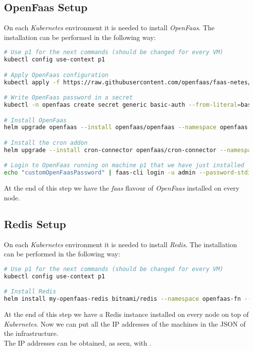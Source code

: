 \subsection{OpenFaas Setup}
On each \textit{Kubernetes} environment it is needed to install \textit{OpenFaas}. The installation can be performed in the following way:
\begin{lstlisting}[language=bash]
# Use p1 for the next commands (should be changed for every VM)
kubectl config use-context p1

# Apply OpenFaas configuration
kubectl apply -f https://raw.githubusercontent.com/openfaas/faas-netes/master/namespaces.yml

# Write OpenFaas password in a secret
kubectl -n openfaas create secret generic basic-auth --from-literal=basic-auth-user=admin --from-literal=basic-auth-password="customOpenFaasPassword"  

# Install OpenFaas
helm upgrade openfaas --install openfaas/openfaas --namespace openfaas --set functionNamespace=openfaas-fn --set basic_auth=true

# Install the cron addon
helm upgrade --install cron-connector openfaas/cron-connector --namespace openfaas

# Login to OpenFaas running on machine p1 that we have just installed
echo "customOpenFaasPassword" | faas-cli login -u admin --password-stdin --gateway http://$(minikube ip --profile p1):31112
\end{lstlisting}
At the end of this step we have the \textit{faas} flavour of \textit{OpenFaas} installed on every node.


\subsection{Redis Setup}
On each \textit{Kubernetes} environment it is needed to install \textit{Redis}. The installation can be performed in the following way:
\begin{lstlisting}[language=bash]
# Use p1 for the next commands (should be changed for every VM)
kubectl config use-context p1

# Install Redis
helm install my-openfaas-redis bitnami/redis --namespace openfaas-fn --set auth.password="customRedisPassword" --set master.persistence.enabled=false
\end{lstlisting}
At the end of this step we have a Redis instance installed on every node on top of \textit{Kubernetes}.
Now we can put all the IP addresses of the machines in the JSON of the infrastructure.
\\The IP addresses can be obtained, as seen, with .


